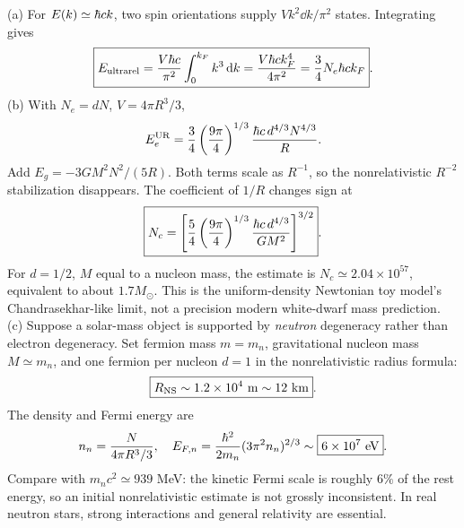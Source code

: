 (a) For $E(k)\simeq\hbar ck$,
two spin orientations supply
$V k^2\dd k/\pi^2$ states.
Integrating gives
\begin{equation}
\boxed{E_{\rm ultrarel}
=\frac{V\hbar c}{\pi^2}\int_0^{k_F}k^3\,\mathrm d k
=\frac{V\hbar ck_F^4}{4\pi^2}
=\frac34N_e\hbar ck_F}.
\end{equation}
(b) With $N_e=dN$, $V=4\pi R^3/3$,
\begin{equation}
E_e^{\rm UR}=
\frac34\left(\frac{9\pi}{4}\right)^{1/3}
\frac{\hbar c\,d^{4/3}N^{4/3}}R.
\end{equation}
Add $E_g=-3GM^2N^2/(5R)$. Both terms
scale as $R^{-1}$, so the
nonrelativistic $R^{-2}$ stabilization
disappears. The coefficient of $1/R$
changes sign at
\begin{equation}
\boxed{N_c=\left[
\frac54\left(\frac{9\pi}{4}\right)^{1/3}
\frac{\hbar c\,d^{4/3}}{GM^2}
\right]^{3/2}}.
\end{equation}
For $d=1/2$, $M$ equal to a nucleon mass,
the estimate is
$\boxed{N_c\simeq2.04\times10^{57}}$,
equivalent to about
$\boxed{1.7M_\odot}$.
This is the uniform-density Newtonian toy
model's Chandrasekhar-like limit, not a
precision modern white-dwarf mass prediction.
(c) Suppose a solar-mass object is supported
by \emph{neutron} degeneracy rather than
electron degeneracy. Set fermion mass
$m=m_n$, gravitational nucleon mass
$M\simeq m_n$, and one fermion per nucleon
$d=1$ in the nonrelativistic radius formula:
\begin{equation}
\boxed{R_{\rm NS}\sim1.2\times10^4\ {\rm m}
\sim12\ {\rm km}}.
\end{equation}
The density and Fermi energy are
\begin{equation}
n_n=\frac{N}{4\pi R^3/3},\quad
E_{F,n}=\frac{\hbar^2}{2m_n}(3\pi^2n_n)^{2/3}
\sim\boxed{6\times10^7\ {\rm eV}}.
\end{equation}
Compare with $m_nc^2\simeq939$ MeV:
the kinetic Fermi scale is roughly
$6\%$ of the rest energy, so an
initial nonrelativistic estimate is not
grossly inconsistent. In real neutron stars,
strong interactions and general relativity
are essential.

